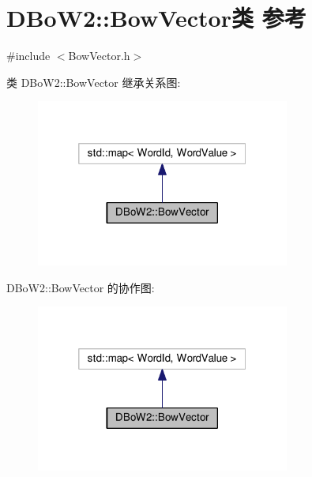 \hypertarget{classDBoW2_1_1BowVector}{\section{D\-Bo\-W2\-:\-:Bow\-Vector类 参考}
\label{classDBoW2_1_1BowVector}
}


{\ttfamily \#include $<$Bow\-Vector.\-h$>$}



类 D\-Bo\-W2\-:\-:Bow\-Vector 继承关系图\-:
\nopagebreak
\begin{figure}[H]
\begin{center}
\leavevmode
\includegraphics[width=236pt]{classDBoW2_1_1BowVector__inherit__graph}
\end{center}
\end{figure}


D\-Bo\-W2\-:\-:Bow\-Vector 的协作图\-:
\nopagebreak
\begin{figure}[H]
\begin{center}
\leavevmode
\includegraphics[width=236pt]{classDBoW2_1_1BowVector__coll__graph}
\end{center}
\end{figure}
